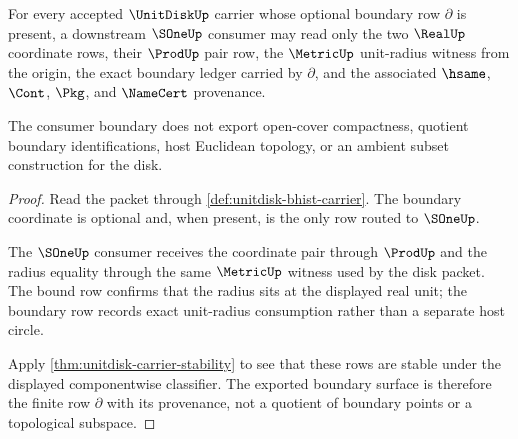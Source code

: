 \begin{theorem}
\label{thm:unitdisk-boundary-sone-consumer}
For every accepted $\UnitDiskUp$ carrier whose optional boundary row $\partial$ is present, a downstream $\SOneUp$ consumer may read only the two $\RealUp$ coordinate rows, their $\ProdUp$ pair row, the $\MetricUp$ unit-radius witness from the origin, the exact boundary ledger carried by $\partial$, and the associated $\hsame$, $\Cont$, $\Pkg$, and $\NameCert$ provenance.

The consumer boundary does not export open-cover compactness, quotient boundary identifications, host Euclidean topology, or an ambient subset construction for the disk.
\end{theorem}
\begin{proof}
Read the packet through \autoref{def:unitdisk-bhist-carrier}. The boundary coordinate is optional and, when present, is the only row routed to $\SOneUp$.

The $\SOneUp$ consumer receives the coordinate pair through $\ProdUp$ and the radius equality through the same $\MetricUp$ witness used by the disk packet. The bound row confirms that the radius sits at the displayed real unit; the boundary row records exact unit-radius consumption rather than a separate host circle.

Apply \autoref{thm:unitdisk-carrier-stability} to see that these rows are stable under the displayed componentwise classifier. The exported boundary surface is therefore the finite row $\partial$ with its provenance, not a quotient of boundary points or a topological subspace.
\end{proof}

